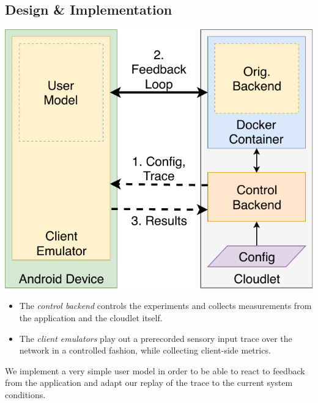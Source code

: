 \documentclass[portrait, a1]{KTHEEposter}
\begin{document}
\begin{pcolumns}[3]
\begin{pcolumn}[2]
\begin{pframe}[1.52]
                \section{Design \& Implementation}
                \begin{center}
                    \medskip
                    \includegraphics[width=.85\linewidth]{img/TraceReplay_GenArch}
                    \medskip
                \end{center}
                \begin{itemize}
                    \item The \emph{control backend} controls the experiments and collects measurements from the application and the cloudlet itself.
                    \item The \emph{client emulators} play out a prerecorded sensory input trace over the network in a controlled fashion, while collecting client-side metrics.
                \end{itemize}
                \begin{center}
                    \medskip
                    
                    \medskip
                \end{center}
                
                We implement a very simple user model in order to be able to react to feedback from the application and adapt our replay of the trace to the current system conditions.
            \end{pframe}%
            \begin{pframe}[.48]

\end{pframe}
\end{pcolumn}
\end{pcolumns}
\end{document}
